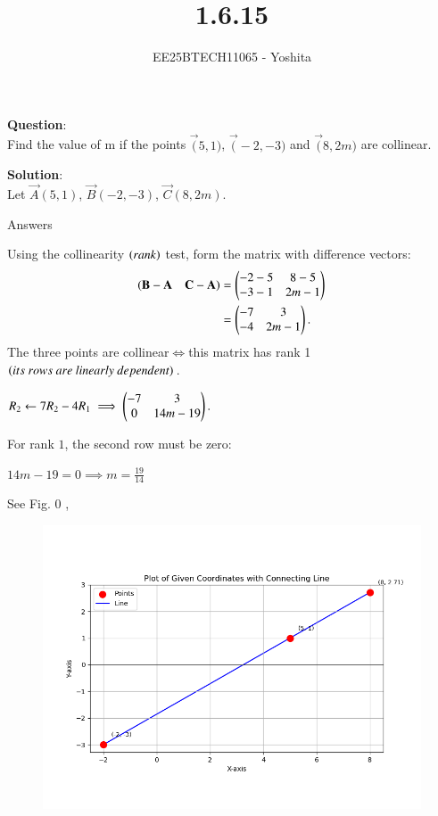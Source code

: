 \documentclass[journal]{IEEEtran}
\begin{document}

\vspace{3cm}

\title{1.6.15}
\author{EE25BTECH11065 - Yoshita}
{\let\newpage\relax\maketitle}

\renewcommand{\thefigure}{\theenumi}
\renewcommand{\thetable}{\theenumi}
\setlength{\intextsep}{10pt} %
\textbf{Question}:\\
    Find the value of m if the points $\vec(5,1)$, $\vec(-2,-3)$ and $\vec(8,2m)$ are collinear.\\
\bigskip

\textbf{Solution}:\\
  Let $\vec{A}(5,1)$, $\vec{B}(-2,-3)$, $\vec{C}(8,2m)$.
\\
\begin{table}[H]    
  \centering
  
  \caption{Answers}
  \label{Answers}
\end{table}
Using the collinearity $\left(rank\right)$ test, form the matrix with difference vectors:
\begin{align*}
    (\mathbf{B}-\mathbf{A} \quad \mathbf{C}-\mathbf{A}) &= \begin{pmatrix}-2-5 & 8-5 \\ -3-1 & 2m-1\end{pmatrix} \\
    &= \begin{pmatrix}-7 & 3 \\ -4 & 2m-1\end{pmatrix}.
\end{align*}
The three points are collinear$\iff$this matrix has rank 1 $\brak{its\ rows\ are\ linearly\ dependent}$.\\
\begin{center}
 $R_2 \leftarrow 7R_2 - 4R_1 \implies  \begin{pmatrix}-7 & 3 \\ 0 & 14m-19\end{pmatrix}.$
 \end{center}

For rank $1$, the second row must be zero:
\begin{center}
$14m - 19 = 0 \implies m = \frac{19}{14}$
\end{center}
See Fig. 0 ,
\begin{figure}[H]
\begin{center}
\includegraphics[width=0.6\columnwidth]{figs/fig.png}
\end{center}
\caption{}
\label{fig:Fig.1}
\end{figure}
\end{document}
